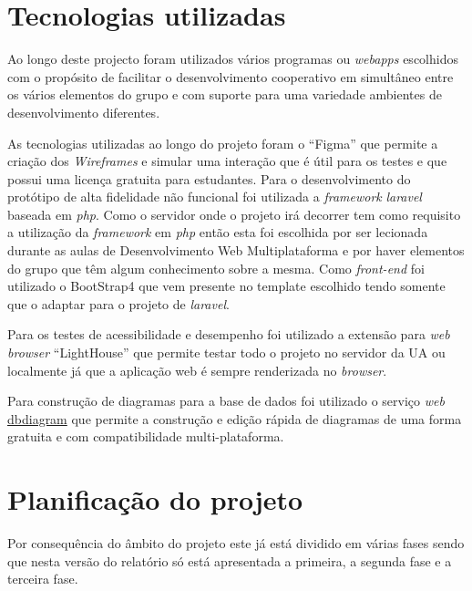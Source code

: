\documentclass[11pt, twoside]{report}
\begin{document}
	\chapter{Tecnologias utilizadas}
	
	Ao longo deste projecto foram utilizados vários programas ou \textit{webapps} escolhidos com o propósito de facilitar o desenvolvimento cooperativo em simultâneo entre os vários elementos do grupo e com suporte para uma variedade ambientes de desenvolvimento diferentes.
	
	As tecnologias utilizadas ao longo do projeto foram o ``Figma'' que permite a criação dos \textit{Wireframes} e simular uma interação que é útil para os testes e que possui uma licença gratuita para estudantes.
	Para o desenvolvimento do protótipo de alta fidelidade não funcional foi utilizada a \textit{framework} \textit{laravel} baseada em \textit{php}.
	Como o servidor onde o projeto irá decorrer tem como requisito a utilização da \textit{framework} em \textit{php} então esta foi escolhida por ser lecionada durante as aulas de Desenvolvimento Web Multiplataforma e por haver elementos do grupo que têm algum conhecimento sobre a mesma.
	Como \textit{front-end} foi utilizado o BootStrap4 que vem presente no template escolhido tendo somente que o adaptar para o projeto de \textit{laravel}.
	
	Para os testes de acessibilidade e desempenho foi utilizado a extensão para \textit{web browser} ``LightHouse'' que permite testar todo o projeto no servidor da UA ou localmente já que a aplicação web é sempre renderizada no \textit{browser}. 
	
	Para construção de diagramas para a base de dados foi utilizado o serviço \textit{web} \href{https://dbdiagram.io/}{dbdiagram} que permite a construção e edição rápida de diagramas de uma forma gratuita e com compatibilidade multi-plataforma.
	
	
	\chapter{Planificação do projeto}

 	Por consequência do âmbito do projeto este já está dividido em várias fases sendo que nesta versão do relatório só está apresentada a primeira, a segunda fase e a terceira fase.
 	
\end{document}
